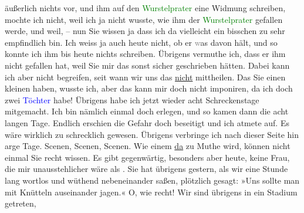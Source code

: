                äußerlich nichts vor, und ihm auf den \textcolor{green}{Wurstelprater}{}\ledrightnote{\textcolor{green}{Quer durch den Wurstelprater}} eine Widmung schreiben, mochte ich nicht, weil ich ja nicht
               wusste, wie ihm der \textcolor{green}{Wurstelprater}{}\ledrightnote{\textcolor{green}{Quer durch den Wurstelprater}} gefallen
               werde, und weil, – nun Sie wissen ja dass ich da vielleicht ein bisschen zu sehr
               empfindlich bin. Ich weiss ja auch heute nicht, ob er
                  \textcolor{gray}{w}as davon hält, und so konnte ich ihm bis heute nichts schreiben. Übrigens vermuthe ich, dass er
               ihm nicht gefallen hat, weil Sie mir das sonst sicher geschrieben hätten. Dabei kann
               ich aber nicht begreifen, {\pb}seit wann wir uns das \uline{nicht} mittheilen. Das Sie
               einen kleinen \label{K_L03159-3v}\label{K_L03159-3h} haben, wusste ich, aber das kann mir
               doch nicht imponiren, da ich doch zwei \textcolor{blue}{Töchter}{}\ledrightnote{{$\rightarrow$}\textcolor{blue}{Maria Charlotte Lamberg}{\newline}{$\rightarrow$}\textcolor{blue}{Caroline Kotter}} habe! Übrigens habe ich jetzt wieder acht
               Schreckenstage mitgemacht. Ich bin nämlich einmal doch erlegen, und so kamen dann die
               acht langen Tage. Endlich erschien die Gefahr doch beseitigt und ich atmete auf. Es
               wäre wirklich zu schrecklich gewesen. Übrigens verbringe ich nach dieser Seite hin
               arge Tage. Scenen, Scenen, Scenen. Wie einem \uline{da} zu
               Muthe wird, können nicht einmal Sie recht wissen. Es gibt gegenwärtig, besonders aber
                  heute, keine Frau, die mir unausstehlicher wäre als
                  \label{K_L03159-4v}\label{K_L03159-4h}. Sie hat übrigens gestern, als wir eine Stunde
               lang wortlos und wüthend nebeneinander saßen, plötzlich gesagt: »Uns sollte man mit
               Knütteln auseinander jagen.« O, wie recht! Wir sind übrigens in ein Stadium getreten,
